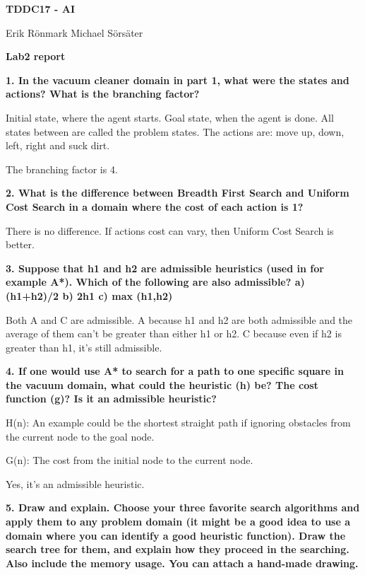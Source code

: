 \documentclass[12pt,a4paper]{article}
\begin{document}
\begin{center}
	\Huge
	\textbf{TDDC17 - AI}

	\vspace{0.3cm}
	\Large
	Erik Rönmark
	Michael Sörsäter
	
	\vspace{0.7cm}
	\textbf{Lab2 report}
\end{center}

\textbf{1. In the vacuum cleaner domain in part 1, what were the states and actions? What is the branching factor?}

Initial state, where the agent starts. Goal state, when the agent is done. All states between are called the problem states. The actions are: move up, down, left, right and suck dirt.

The branching factor is 4.


\textbf{2. What is the difference between Breadth First Search and Uniform Cost Search in a domain where the cost of each action is 1?}

There is no difference. If actions cost can vary, then Uniform Cost Search is better.


\textbf{3. Suppose that h1 and h2 are admissible heuristics (used in for example A*). Which of the following are also admissible?
a) (h1+h2)/2
b) 2h1
c) max (h1,h2)}

Both A and C are admissible. A because h1 and h2 are both admissible and the average of them can't be greater than either h1 or h2. C because even if h2 is greater than h1, it's still admissible. 

\textbf{4. If one would use A* to search for a path to one specific square in the vacuum domain, what could the heuristic (h) be? The cost function (g)? Is it an admissible heuristic?}

H(n): An example could be the shortest straight path if ignoring obstacles from the current node to the goal node.

G(n): The cost from the initial node to the current node.

Yes, it's an admissible heuristic.

\newpage

\textbf{5. Draw and explain. Choose your three favorite search algorithms and apply them to any problem domain (it might be a good idea to use a domain where you can identify a good heuristic function). Draw the search tree for them, and explain how they proceed in the searching. Also include the memory usage. You can attach a hand-made drawing.}
\end{document}
